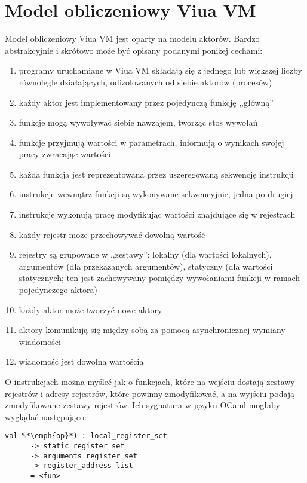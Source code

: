 \chapter{Model obliczeniowy Viua VM}
\label{appendix_viua_vm_execution_model}

Model obliczeniowy Viua VM jest oparty na modelu aktorów. Bardzo abstrakcyjnie i
skrótowo może być opisany podanymi poniżej cechami:

\begin{enumerate}
\item programy uruchamiane w Viua VM składają się z jednego lub większej liczby
    równolegle działających, odizolowanych od siebie aktorów (procesów)
\item każdy aktor jest implementowany przez pojedynczą funkcję ,,główną''
\item funkcje mogą wywoływać siebie nawzajem, tworząc stos wywołań
\item funkcje przyjmują wartości w parametrach, informują o wynikach swojej
    pracy zwracając wartości
\item każda funkcja jest reprezentowana przez uszeregowaną sekwencję instrukcji
\item instrukcje wewnątrz funkcji są wykonywane sekwencyjnie, jedna po drugiej
\item instrukcje wykonują pracę modyfikując wartości znajdujące się w rejestrach
\item każdy rejestr może przechowywać dowolną wartość
\item rejestry są grupowane w ,,zestawy'': lokalny (dla wartości lokalnych),
    argumentów (dla przekazanych argumentów), statyczny (dla wartości
    statycznych; ten jest zachowywany pomiędzy wywołaniami funkcji w ramach
    pojedynczego aktora)
\item każdy aktor może tworzyć nowe aktory
\item aktory komunikują się między sobą za pomocą asynchronicznej wymiany
    wiadomości
\item wiadomość jest dowolną wartością
\end{enumerate}

O instrukcjach można myśleć jak o funkcjach, które na wejściu dostają zestawy
rejestrów i adresy rejestrów, które powinny zmodyfikować, a na wyjściu podają
zmodyfikowane zestawy rejestrów. Ich sygnatura w języku OCaml mogłaby wyglądać
następująco:

\begin{lstlisting}
val %*\emph{op}*) : local_register_set
      -> static_register_set
      -> arguments_register_set
      -> register_address list
      = <fun>
\end{lstlisting}
